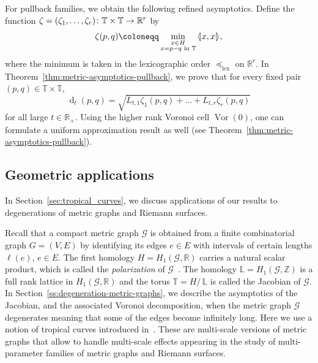 \documentclass[AHL,Unicode,longabstracts]{cedram}
\newcommand{\llangle}{\mathopen{\langle\mkern -3.1mu\lvert}}
\newcommand{\rrangle}{\mathclose{\rvert\mkern -3.1mu\rangle}}
\newcommand{\highinn}[2]{{\llangle#2\rrangle_{#1}}}
\newcommand{\rquot}[2]{#1/\,#2}
\DeclareMathOperator{\Vor}{Vor}
\DeclareMathOperator{\dist}{d}
\newcommand{\R}{\mathbb{R}}
\newcommand{\Z}{\mathbb{Z}}
\newcommand{\T}{\mathbb{T}}
\renewcommand{\L}{\mathbb{L}}
\newcommand{\mgr}{\mathcal{G}}
\newcommand{\dtor}{\zeta}
\newcommand{\lexeq}{\preceq_{\mathrm{lex}}}
\renewcommand*{\to}{\mathchoice{\longrightarrow}{\rightarrow}{\rightarrow}{\rightarrow}}
\begin{document}
For pullback families, we obtain the following refined asymptotics. Define the function $\dtor = (\dtor_1, \dots, \dtor_r) \colon \T\times \T \to \R^r$ by
\begin{align*}
\dtor(p,q) \coloneqq \min_{\substack{x \in H\\ x = p-q \text{ in } \T}} \highinn{}{x,x},
\end{align*}
where the minimum is taken in the lexicographic order $\lexeq$ on $\R^r$. In Theorem~\ref{thm:metric-asymptotics-pullback}, we prove that for every fixed pair $(p,q) \in \T \times \T$,
\[
\dist_t(p,q) = \sqrt{L_{t,1} \dtor_1(p,q) + \dots + L_{t,r} \dtor_r(p,q)}
\]
for all large $t \in \R_+$. Using the higher rank Voronoi cell $\Vor(0)$, one can formulate a uniform approximation result as well (see Theorem~\ref{thm:metric-asymptotics-pullback}).


\subsection{Geometric applications}

In Section~\ref{sec:tropical_curves}, we discuss applications of our results to degenerations of metric graphs and Riemann surfaces.


Recall that a compact metric graph $\mgr$ is obtained from a finite combinatorial graph $G=(V,E)$ by identifying its edges $e \in E$ with intervals of certain lengths $\ell(e)$, $e \in E$. The first homology $H = H_1(\mgr, \R)$ carries a natural scalar product, which is called the \emph{polarization} of $\mgr$~\cite{BLN97,BR07,CV10,KS00,MZ08}. The homology $\L= H_1(\mgr, \Z)$ is a full rank lattice in $H_1(\mgr, \R)$ and the torus $\T= \rquot{H}{\L}$ is called the Jacobian of $\mgr$. In Section~\ref{ss:degeneration-metric-graphs}, we describe the asymptotics of the Jacobian, and the associated Voronoi decomposition, when the metric graph $\mgr$ degenerates meaning that some of the edges become infinitely long. Here we use a notion of tropical curves introduced in~\cite{AN2,AN}. These are multi-scale versions of metric graphs that allow to handle multi-scale effects appearing in the study of multi-parameter families of metric graphs and Riemann surfaces.
\end{document}
